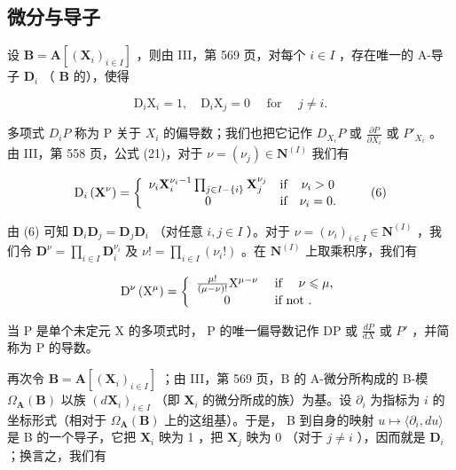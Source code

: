 \subsection{微分与导子}

设 \(\mathbf{B} = \mathbf{A}[(\mathbf{X}_i)_{i\in I}]\) ，则由 III，第 569 页，对每个 \(i\in I\) ，存在唯一的 A-导子 \(\mathbf{D}_i\) （ \(\mathbf{B}\) 的），使得

\[
\mathrm{D} _ {i} \mathrm{X} _ {i} = 1, \quad \mathrm{D} _ {i} \mathrm{X} _ {j} = 0 \quad \text { for } \quad j \neq i.\tag{5}
\]

多项式 \(D_{i}P\) 称为 P 关于 \(X_{i}\) 的偏导数；我们也把它记作 \(D_{X_{i}}P\) 或 \(\frac{\partial P}{\partial X_{i}}\) 或 \(P'_{X_{i}}\) 。由 III，第 558 页，公式 (21)，对于 \(\nu = (\nu_{j}) \in \mathbf{N}^{(I)}\) 我们有

\[
\mathrm{D} _ {i} \left(\mathbf {X} ^ {\nu}\right) = \left\{ \begin{array}{c c c} \nu_ {i} \mathbf {X} _ {i} ^ {\nu_ {i} - 1} \prod_ {j \in I - \{i \}} \mathbf {X} _ {j} ^ {\nu_ {j}} & \text {if} & \nu_ {i} > 0 \\ 0 & \text {if} & \nu_ {i} = 0. \end{array} \right.\tag{6}
\]

由 (6) 可知 \(\mathbf{D}_i\mathbf{D}_j = \mathbf{D}_j\mathbf{D}_i\) （对任意 \(i, j \in I\) ）。对于 \(\nu = (\nu_i)_{i \in I} \in \mathbf{N}^{(I)}\) ，我们令 \(\mathbf{D}^{\nu} = \prod_{i \in I} \mathbf{D}_i^{\nu_i}\) 及 \(\nu! = \prod_{i \in I} (\nu_i!)\) 。在 \(\mathbf{N}^{(I)}\) 上取乘积序，我们有

\[
\mathrm{D} ^ {\nu} \left(\mathrm{X} ^ {\mu}\right) = \left\{ \begin{array}{c l} \frac {\mu !}{(\mu - \nu) !} \mathrm{X} ^ {\mu - \nu} & \text { if } \quad \nu \leqslant \mu , \\ 0 & \text { if   not }. \end{array} \right.
\]

当 P 是单个未定元 X 的多项式时， P 的唯一偏导数记作 DP 或 \(\frac{dP}{dX}\) 或 \(P'\) ，并简称为 P 的导数。

再次令 \(\mathbf{B} = \mathbf{A}\left[(\mathbf{X}_i)_{i\in I}\right]\) ；由 III，第 569 页，B 的 A-微分所构成的 B-模 \(\Omega_{\mathbf{A}}(\mathbf{B})\) 以族 \((d\mathbf{X}_i)_{i\in I}\) （即 \(\mathbf{X}_i\) 的微分所成的族）为基。设 \(\partial_i\) 为指标为 \(i\) 的坐标形式（相对于 \(\Omega_{\mathbf{A}}(\mathbf{B})\) 上的这组基）。于是， B 到自身的映射 \(u\mapsto \langle \partial_i,du\rangle\) 是 B 的一个导子，它把 \(\mathbf{X}_i\) 映为 1 ，把 \(\mathbf{X}_j\) 映为 0 （对于 \(j\neq i\) ），因而就是 \(\mathbf{D}_i\) ；换言之，我们有

